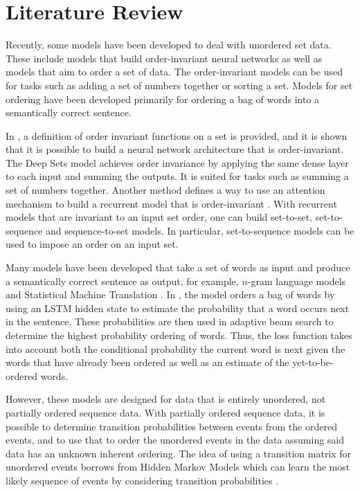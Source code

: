 \documentclass[reqno ,11pt]{article}
\begin{document}
\section{Literature Review}

Recently, some models have been developed to deal with unordered set data. These include models that build order-invariant neural networks as well as models that aim to order a set of data. The order-invariant models can be used for tasks such as adding a set of numbers together or sorting a set. Models for set ordering have been developed primarily for ordering a bag of words into a semantically correct sentence. 

In \cite{deep-sets}, a definition of order invariant functions on a set is provided, and it is shown that it is possible to build a neural network architecture that is order-invariant. The Deep Sets model achieves order invariance by applying the same dense layer to each input and summing the outputs.  It is suited for tasks such as summing a set of numbers together. Another method defines a way to use an attention mechanism to build a recurrent model that is order-invariant \cite{order-matters}. With recurrent models that are invariant to an input set order, one can build set-to-set, set-to-sequence and sequence-to-set models. In particular, set-to-sequence models can be used to impose an order on an input set. 

Many models have been developed that take a set of words as input and produce a semantically correct sentence as output, for example, $n$-gram language models and Statistical Machine Translation \cite{n-gram, SMT}. In \cite{word-ordering}, the model orders a bag of words by using an LSTM hidden state to estimate the probability that a word occurs next in the sentence. These probabilities are then used in adaptive beam search to determine the highest probability ordering of words. Thus, the loss function takes into account both the conditional probability the current word is next given the words that have already been ordered as well as an estimate of the yet-to-be-ordered words. 

However, these models are designed for data that is entirely unordered, not partially ordered sequence data. With partially ordered sequence data, it is possible to determine transition probabilities between events from the ordered events, and to use that to order the unordered events in the data assuming said data has an unknown inherent ordering. The idea of using a transition matrix for unordered events borrows from Hidden Markov Models which can learn the most likely sequence of events by considering transition probabilities \cite{HMM}.
\end{document}

